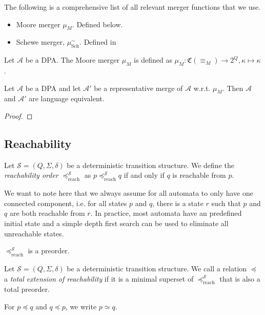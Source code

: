 The following is a comprehensive list of all relevant merger functions that we use.

\begin{itemize}
	\item Moore merger $\mu_M$. Defined below.
	\item Schewe merger, $\mu_\text{Sch}^\sim$. Defined in %
\end{itemize}

\begin{defn}
	Let $\mathcal{A}$ be a DPA. The Moore merger $\mu_M$ is defined as $\mu_M : \mathfrak{C}(\equiv_M) \rightarrow 2^Q, \kappa \mapsto \kappa$.
\end{defn}

\begin{lem}
	Let $\mathcal{A}$ be a DPA and let $\mathcal{A}'$ be a representative merge of $\mathcal{A}$ w.r.t. $\mu_M$. Then $\mathcal{A}$ and $\mathcal{A}'$ are language equivalent.
\end{lem}

\begin{proof}
\end{proof}





\subsection{Reachability}

\begin{defn}
	Let $\mathcal{S} = (Q, \Sigma, \delta)$ be a deterministic transition structure. We define the \emph{reachability order} $\preceq_\text{reach}^\mathcal{S}$ as $p \preceq_\text{reach}^\mathcal{S} q$ if and only if $q$ is reachable from $p$. 
\end{defn}

We want to note here that we always assume for all automata to only have one connected component, i.e. for all states $p$ and $q$, there is a state $r$ such that $p$ and $q$ are both reachable from $r$. In practice, most automata have an predefined initial state and a simple depth first search can be used to eliminate all unreachable states.

\begin{lem}
	$\preceq_\text{reach}^\mathcal{S}$ is a preorder.
\end{lem}

\begin{defn}
	Let $\mathcal{S} = (Q, \Sigma, \delta)$ be a deterministic transition structure. We call a relation $\preceq$ a \emph{total extension of reachability} if it is a minimal superset of $\preceq_\text{reach}^\mathcal{S}$ that is also a total preorder.
	
	For $p \preceq q$ and $q \preceq p$, we write $p \simeq q$.
\end{defn}

